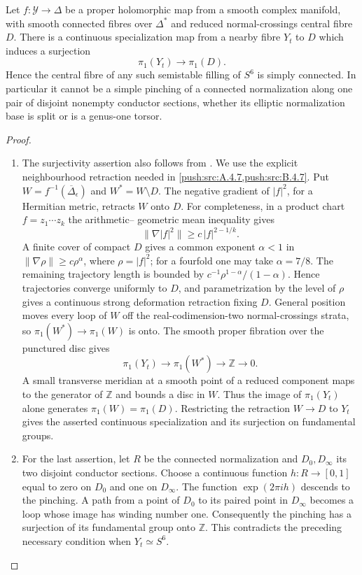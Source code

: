 \begin{theorem}\hypertarget{tag-030O}{}\label{push:src:B.4.2}\label{push:B42}

Let $f:\mathcal Y\to\Delta$ be a
proper holomorphic map from a smooth
complex manifold, with smooth connected
fibres over $\Delta^*$ and reduced
normal-crossings central fibre $D$.
There is a continuous specialization
map from a nearby fibre $Y_t$ to $D$
which induces a surjection
\[
 \pi_1(Y_t)\longrightarrow\pi_1(D).
\]
Hence the central fibre of any such
semistable filling of $S^6$ is simply
connected. In particular it cannot
be a simple pinching of a connected
normalization along one pair of
disjoint nonempty conductor sections,
whether its elliptic normalization
base is split or is a genus-one torsor.
\end{theorem}


\begin{proof}
\begin{enumerate}[label=\arabic*.,leftmargin=*]
\item The surjectivity assertion also follows from
\cite[Theorem~5.1, p.~2226]{NO10}. We use the explicit neighbourhood
retraction needed in \cref{push:src:A.4.7,push:src:B.4.7}. Put
$W=f^{-1}(\overline\Delta_\epsilon)$
and $W^*=W\setminus D$. The negative
gradient of $|f|^2$, for a Hermitian
metric, retracts $W$ onto $D$.
For completeness, in a product chart
$f=z_1\cdots z_k$ the arithmetic--
geometric mean inequality gives
\[
 \|\nabla |f|^2\|
   \ge c\,|f|^{2-1/k}.
\]
A finite cover of compact $D$ gives
a common exponent $\alpha<1$ in
$\|\nabla\rho\|\ge c\rho^\alpha$,
where $\rho=|f|^2$; for a fourfold
one may take $\alpha=7/8$.
The remaining trajectory length is
bounded by
$c^{-1}\rho^{1-\alpha}/(1-\alpha)$.
Hence trajectories converge uniformly
to $D$, and parametrization by the
level of $\rho$ gives a continuous
strong deformation retraction fixing
$D$. General position moves every
loop of $W$ off the real-codimension-two
normal-crossings strata, so
$\pi_1(W^*)\to\pi_1(W)$ is onto.
The smooth proper fibration over the
punctured disc gives
\[
 \pi_1(Y_t)\longrightarrow\pi_1(W^*)
       \longrightarrow\mathbb Z\longrightarrow0.
\]
A small transverse meridian at a
smooth point of a reduced component
maps to the generator of $\mathbb Z$
and bounds a disc in $W$.
Thus the image of $\pi_1(Y_t)$ alone
generates $\pi_1(W)=\pi_1(D)$. Restricting the retraction
$W\to D$ to $Y_t$ gives the asserted continuous specialization
and its surjection on fundamental groups.

\item For the last assertion, let $R$ be
the connected normalization and
$D_0,D_\infty$ its two disjoint
conductor sections. Choose a
continuous function $h:R\to[0,1]$
equal to zero on $D_0$ and one on
$D_\infty$. The function
$\exp(2\pi i h)$ descends to the
pinching. A path from a point of
$D_0$ to its paired point in
$D_\infty$ becomes a loop whose
image has winding number one.
Consequently the pinching has a
surjection of its fundamental group
onto $\mathbb Z$. This contradicts
the preceding necessary condition
when $Y_t\simeq S^6$.
\end{enumerate}
\end{proof}
